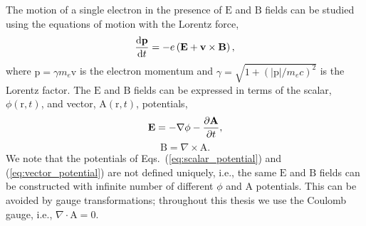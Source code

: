 \documentclass[10pt, a4paper, twoside, openright]{report}
\newcommand{\norm}[1]{|#1|}
\renewcommand{\vec}[1]{\boldsymbol{\mathrm{#1}}}
\newcommand{\rot}[1]{\nabla \times #1}
\newcommand{\grad}[1]{\nabla #1}
\renewcommand{\div}[1]{\nabla \cdot #1}
\begin{document}
The motion of a single electron in the presence of $ \vec{E} $ and $ \vec{B} $ fields can be studied using the equations of motion with the Lorentz force,
\begin{equation}\label{eq:lorentz_eq}
	\diff{\vec{p}}{t} = -e \left( \vec{E} + \vec{v} \times \vec{B} \right),
\end{equation}
where $ \vec{p} = \gamma m_e \vec{v} $ is the electron momentum and $ \gamma = \sqrt{1 + \left( \norm{\vec{p}} / m_e c \right)^2 } $ is the Lorentz factor. The $ \vec{E} $ and $ \vec{B} $ fields can be expressed in terms of the scalar, $ \phi \left( \vec{r}, t \right) $, and vector, $ \vec{A} \left( \vec{r}, t \right) $, potentials,
\begin{equation}\label{eq:scalar_potential}
	\vec{E} = -\grad{\phi} - \diffp{\vec{A}}{t},
\end{equation}
\begin{equation}\label{eq:vector_potential}
	\vec{B} = \rot{\vec{A}}.
\end{equation}
We note that the potentials of Eqs.~(\ref{eq:scalar_potential}) and (\ref{eq:vector_potential}) are not defined uniquely, i.e., the same $ \vec{E} $ and $ \vec{B} $ fields can be constructed with infinite number of different $ \phi $ and $ \vec{A} $ potentials. This can be avoided by gauge transformations; throughout this thesis we use the Coulomb gauge, i.e., $ \div{\vec{A}} = 0 $. 
\end{document}
